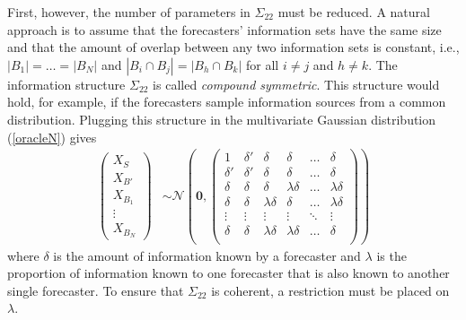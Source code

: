 \documentclass[11pt]{article}
\theoremstyle{definition}
\theoremstyle{definition}
\def\probit{p_{\rm probit}}
\begin{document}
First, however, the number of parameters in $\Sigma_{22}$ must be
reduced. A natural approach is to assume that the forecasters'
information sets have the same size and that the amount of overlap
between any two information sets is constant, i.e., $|B_{1}| = \dots =
|B_{N}|$ and $|B_{i} \cap B_{j}| = |B_{h} \cap B_{k}|$ for all $i \neq
j$ and $h \neq k$.
The information structure $\Sigma_{22}$ is called \textit{compound
symmetric}.  This structure would hold, for example, if the
forecasters sample information sources from a common distribution.
Plugging this structure in the multivariate Gaussian distribution
(\ref{oracleN}) gives
\begin{align*}
\left(\begin{matrix} X_{S} \\ X_{B'}\\ X_{B_1}\\ \vdots \\ X_{B_N} \end{matrix}\right) &\sim \mathcal{N}\left( 
 \boldsymbol{0}, 
 \left(\begin{array}{cc|cccc}
1 & \delta'& \delta & \delta & \dots & \delta  \\ 
\delta' & \delta' & \delta & \delta & \dots & \delta  \\ \hline
\delta & \delta &\delta & \lambda\delta & \dots & \lambda\delta   \\ 
\delta& \delta & \lambda\delta & \delta & \dots & \lambda\delta  \\ 
\vdots &\vdots & \vdots & \vdots & \ddots & \vdots  \\ 
\delta &\delta & \lambda\delta & \lambda\delta & \dots & \delta\\ 
 \end{array}\right)\right)
\end{align*}
where $\delta$ is the amount of information known by a forecaster and
$\lambda$ is the proportion of information known to one forecaster
that is also known to another single forecaster.  To ensure that
$\Sigma_{22}$ is coherent, a restriction must be placed on $\lambda$.
\end{document}
